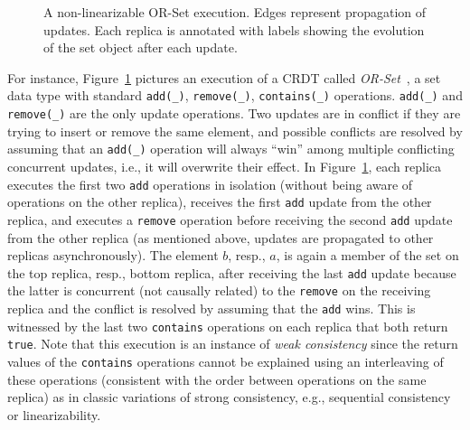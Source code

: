 \begin{figure}
\caption{A non-linearizable OR-Set execution. Edges represent propagation of updates. Each replica is annotated with labels showing the evolution of the set object after each update.}
\label{fig:crdt:intro}
\end{figure}

For instance, Figure~\ref{fig:crdt:intro} pictures an execution of a CRDT called \emph{OR-Set}~\cite{DBLP:conf/sss/ShapiroPBZ11}, a set data type with standard \texttt{add(\_)}, \texttt{remove(\_)}, \texttt{contains(\_)} operations. \texttt{add(\_)} and \texttt{remove(\_)} are the only update operations. Two updates are in conflict if they are trying to insert or remove the same element, and possible conflicts are resolved by assuming that an \texttt{add(\_)} operation will always ``win'' among multiple conflicting concurrent updates, i.e., it will overwrite their effect. In Figure~\ref{fig:crdt:intro}, each replica executes the first two \texttt{add} operations in isolation (without being aware of operations on the other replica), receives the first \texttt{add} update from the other replica, and executes a \texttt{remove} operation before receiving the second \texttt{add} update from the other replica (as mentioned above, updates are propagated to other replicas asynchronously). The element $b$, resp., $a$, is again a member of the set on the top replica, resp., bottom replica, after receiving the last \texttt{add} update because the latter is concurrent (not causally related) to the \texttt{remove} on the receiving replica and the conflict is resolved by assuming that the \texttt{add} wins. This is witnessed by the last two \texttt{contains} operations on each replica that both return \texttt{true}. Note that this execution is an instance of \emph{weak consistency} since the return values of the \texttt{contains} operations cannot be explained using an interleaving of these operations (consistent with the order between operations on the same replica) as in classic variations of strong consistency, e.g., sequential consistency~\cite{DBLP:journals/tc/Lamport79} or linearizability\cite{DBLP:journals/toplas/HerlihyW90}.

